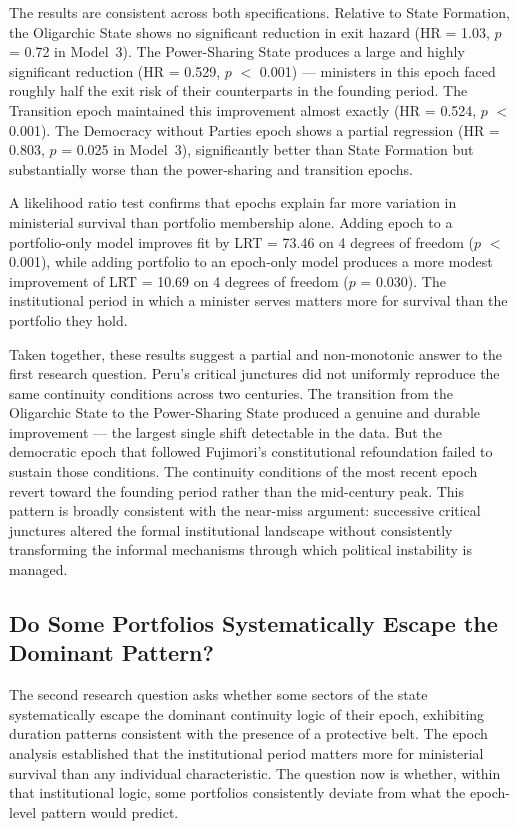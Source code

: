 \documentclass[doc, 12pt, a4paper,floatsintext]{apa7}
\begin{document}
The results are consistent across both specifications. Relative to 
State Formation, the Oligarchic State shows no significant reduction 
in exit hazard (HR = 1.03, $p$ = 0.72 in Model~3). The 
Power-Sharing State produces a large and highly significant 
reduction (HR = 0.529, $p$ $<$ 0.001) --- ministers in this epoch 
faced roughly half the exit risk of their counterparts in the 
founding period. The Transition epoch maintained this improvement 
almost exactly (HR = 0.524, $p$ $<$ 0.001). The Democracy without 
Parties epoch shows a partial regression (HR = 0.803, $p$ = 0.025 
in Model~3), significantly better than State Formation but 
substantially worse than the power-sharing and transition epochs.

A likelihood ratio test confirms that epochs explain far more 
variation in ministerial survival than portfolio membership alone. 
Adding epoch to a portfolio-only model improves fit by LRT = 73.46 
on 4 degrees of freedom ($p$ $<$ 0.001), while adding portfolio to 
an epoch-only model produces a more modest improvement of 
LRT = 10.69 on 4 degrees of freedom ($p$ = 0.030). The 
institutional period in which a minister serves matters more for 
survival than the portfolio they hold.

Taken together, these results suggest a partial and non-monotonic 
answer to the first research question. Peru's critical junctures 
did not uniformly reproduce the same continuity conditions across 
two centuries. The transition from the Oligarchic State to the 
Power-Sharing State produced a genuine and durable improvement --- 
the largest single shift detectable in the data. But the democratic 
epoch that followed Fujimori's constitutional refoundation failed 
to sustain those conditions. The continuity conditions of the most 
recent epoch revert toward the founding period rather than the 
mid-century peak. This pattern is broadly consistent with the 
near-miss argument: successive critical junctures altered the 
formal institutional landscape without consistently transforming 
the informal mechanisms through which political instability is 
managed.

\subsection{Do Some Portfolios Systematically Escape the 
Dominant Pattern?}

The second research question asks whether some sectors of the 
state systematically escape the dominant continuity logic of their 
epoch, exhibiting duration patterns consistent with the presence 
of a protective belt. The epoch analysis established that the 
institutional period matters more for ministerial survival than 
any individual characteristic. The question now is whether, within 
that institutional logic, some portfolios consistently deviate from 
what the epoch-level pattern would predict.
\end{document}
